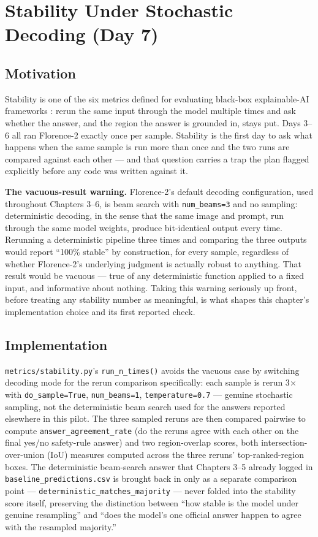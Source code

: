 \chapter{Stability Under Stochastic Decoding (Day 7)}
\label{chap:day07}

\section{Motivation}

Stability is one of the six metrics defined for evaluating black-box explainable-AI frameworks
\citep{arreche2024exai}: rerun the same input through the model multiple times and ask whether the
answer, and the region the answer is grounded in, stays put. Days 3--6 all ran Florence-2 exactly
once per sample. Stability is the first day to ask what happens when the same sample is run more
than once and the two runs are compared against each other --- and that question carries a trap the
plan flagged explicitly before any code was written against it.

\textbf{The vacuous-result warning.} Florence-2's default decoding configuration, used throughout
Chapters 3--6, is beam search with \texttt{num\_beams=3} and no sampling: deterministic decoding,
in the sense that the same image and prompt, run through the same model weights, produce
bit-identical output every time. Rerunning a deterministic pipeline three times and comparing the
three outputs would report ``100\% stable'' by construction, for every sample, regardless of
whether Florence-2's underlying judgment is actually robust to anything. That result would be
vacuous --- true of any deterministic function applied to a fixed input, and informative about
nothing. Taking this warning seriously up front, before treating any stability number as
meaningful, is what shapes this chapter's implementation choice and its first reported check.

\section{Implementation}

\texttt{metrics/stability.py}'s \texttt{run\_n\_times()} avoids the vacuous case by switching
decoding mode for the rerun comparison specifically: each sample is rerun 3$\times$ with
\texttt{do\_sample=True}, \texttt{num\_beams=1}, \texttt{temperature=0.7} --- genuine stochastic
sampling, not the deterministic beam search used for the answers reported elsewhere in this pilot.
The three sampled reruns are then compared pairwise to compute \texttt{answer\_agreement\_rate}
(do the reruns agree with each other on the final yes/no safety-rule answer) and two region-overlap
scores, both intersection-over-union (IoU) measures computed across the three reruns'
top-ranked-region boxes. The deterministic beam-search answer that Chapters 3--5 already logged in
\texttt{baseline\_predictions.csv} is brought back in only as a separate comparison point ---
\texttt{deterministic\_matches\_majority} --- never folded into the stability score itself,
preserving the distinction between ``how stable is the model under genuine resampling'' and ``does
the model's one official answer happen to agree with the resampled majority.''


